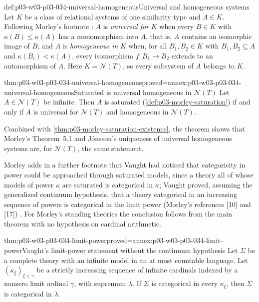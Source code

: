 \begin{hbdefinition}{def:p03-w03-p03-034-universal-homogeneous}{Universal and homogeneous systems}
Let \(K\) be a class of relational systems of one similarity type and
\(A\in K\). Following Morley's footnote \cite[p.~535, n.~22]{Morley1965}:
\(A\) is \emph{universal for} \(K\) when every \(B\in K\) with
\(\kappa(B)\leq\kappa(A)\) has a monomorphism into \(A\), that is, \(A\)
contains an isomorphic image of \(B\); and \(A\) is \emph{homogeneous in}
\(K\) when, for all \(B_1,B_2\in K\) with \(B_1,B_2\subseteq A\) and
\(\kappa(B_i)<\kappa(A)\), every isomorphism \(f:B_1\to B_2\) extends to
an automorphism of \(A\). Here \(K=\mathcal N(T)\), so every subsystem of
\(A\) belongs to \(K\).
\end{hbdefinition}

\begin{hbtheorem}{thm:p03-w03-p03-034-universal-homogeneous}{proved=annex:p03-w03-p03-034-universal-homogeneous}{Saturated is universal homogeneous in \(\mathcal N(T)\)}
Let \(A\in\mathcal N(T)\) be infinite. Then \(A\) is saturated
(\cref{def:p03-morley-saturation}) if and only if \(A\) is universal for
\(\mathcal N(T)\) and homogeneous in \(\mathcal N(T)\).
\end{hbtheorem}

Combined with \cref{thm:p03-morley-saturation-existence}, the theorem
shows that Morley's Theorem~5.1 and Jónsson's uniqueness of universal
homogeneous systems are, for \(\mathcal N(T)\), the same statement.

Morley adds in a further footnote that Vaught had noticed that categoricity
in power could be approached through saturated models, since a theory all
of whose models of power \(\kappa\) are saturated is categorical in
\(\kappa\); Vaught proved, assuming the generalized continuum hypothesis,
that a theory categorical in an increasing sequence of powers is
categorical in the limit power (Morley's references [10] and [17])
\cite[p.~535, n.~23]{Morley1965}. For Morley's standing theories the
conclusion follows from the main theorem with no hypothesis on cardinal
arithmetic.

\begin{hbcorollary}{thm:p03-w03-p03-034-limit-power}{proved=annex:p03-w03-p03-034-limit-power}{Vaught's limit-power statement without the continuum hypothesis}
Let \(\Sigma\) be a complete theory with an infinite model in an at most
countable language. Let \((\kappa_\xi)_{\xi<\gamma}\) be a strictly
increasing sequence of infinite cardinals indexed by a nonzero limit ordinal
\(\gamma\), with supremum \(\lambda\). If \(\Sigma\) is categorical in
every \(\kappa_\xi\), then \(\Sigma\) is categorical in \(\lambda\).
\end{hbcorollary}

